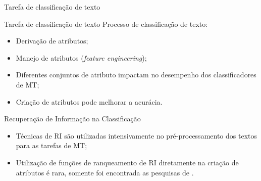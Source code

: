 \documentclass[%
  10pt,%
  aspectratio = 169,%
  compress,%
  t,%
]{beamer}%
\begin{document}
    \begin{frame}{}{Tarefa de classificação de texto}
        
    \end{frame}

    \begin{frame}{}{Tarefa de classificação de texto}
        Processo de classificação de texto:
        \begin{itemize}
            \item Derivação de atributos;
            \item Manejo de atributos (\textit{feature engineering});
            \item Diferentes conjuntos de atributo impactam no desempenho dos classificadores de MT;
            \item Criação de atributos pode melhorar a acurácia.
        \end{itemize}
        \begin{block}{Recuperação de Informação na Classificação}
            \begin{itemize}
                \item Técnicas de RI são utilizadas intensivamente no pré-processamento dos textos para as tarefas de MT;
                \item Utilização de funções de ranqueamento de RI diretamente na criação de atributos é rara, somente foi encontrada as pesquisas de \cite{WEREN_MESTRADO_2014}.
            \end{itemize}
        \end{block}
    \end{frame}
\end{document}
